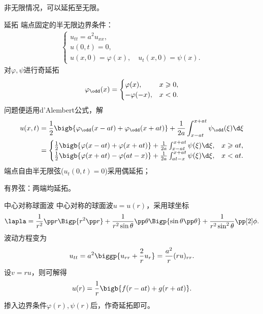 非无限情况，可以延拓至无限。
\begin{example}{延拓}{}
	端点固定的半无限边界条件：
	\begin{align*}
		\begin{cases}
			u_{tt}=a^2u_{xx},\\
			u(0,t)=0,\\
			u(x,0)=\varphi(x),\quad u_t(x,0)=\psi(x).
		\end{cases}
	\end{align*}
	对$\varphi,\psi$进行奇延拓
	\begin{align*}
		\varphi_\odd(x)=
		\begin{cases}
			\varphi(x),   & x\geqslant 0, \\
			-\varphi(-x), & x<0.
		\end{cases}
	\end{align*}
	问题便适用d'Alembert公式，解
	\begin{align*}
		u(x,t) & =\frac12\bigb{\varphi_\odd(x-at)+\varphi_\odd(x+at)}+\frac1{2a}\int_{x-at}^{x+at}\psi_\odd(\xi)\d\xi \\
			   & = 
		\begin{cases}
			\frac12\bigb{\varphi(x-at)+\varphi(x+at)}+\frac1{2a}\int_{x-at}^{x+at}\psi(\xi)\d\xi, & x\geqslant at, \\
			\frac12\bigb{\varphi(x+at)-\varphi(at-x)}+\frac1{2a}\int_{at-x}^{x+at}\psi(\xi)\d\xi, & x<at.
		\end{cases}
	\end{align*}
	\tcblower
	端点自由半无限弦($u_t(0,t)=0$)采用偶延拓；
	
	有界弦：两端均延拓。
\end{example}
\begin{example}{中心对称球面波}{}
	中心对称的球面波$u=u(r)$，采用球坐标
	\[
		\lapla=\frac1{r^2}\pp r\Bigp{r^2\pp r}+\frac1{r^2\sin\theta}\pp \theta\Bigp{\sin\theta\pp \theta}+\frac1{r^2\sin^2\theta}\pp[2]\phi.
	\]
	波动方程变为
	\[
		u_{tt}=a^2\biggp{u_{rr}+\frac2ru_r}=\frac{a^2}r(ru)_{rr}.
	\]
	设$v=ru$，则可解得
	\[
		u(r)=\frac1r\bigb{f(r-at)+g(r+at)}.
	\]
	掺入边界条件$\varphi(r),\psi(r)$后，作奇延拓即可。
\end{example}

